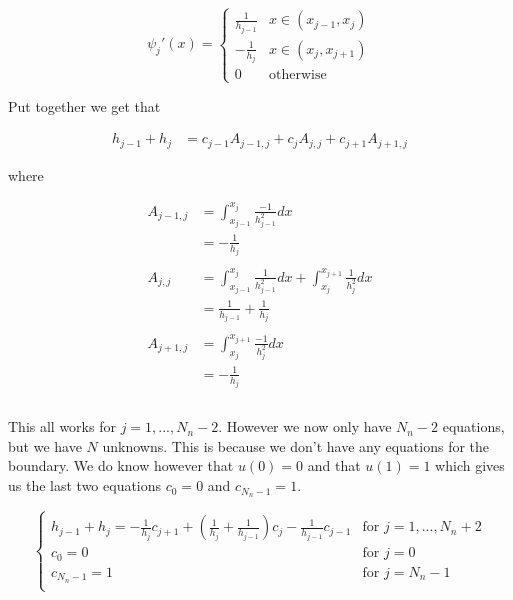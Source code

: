 \documentclass[12pt, a4paper]{article}
\begin{document}
{\begin{equation*}
    \psi_j'(x) = 
    \begin{cases}
        \frac{1}{h_{j-1}} & x \in (x_{j-1}, x_j) \\
        -\frac{1}{h_{j}} & x \in (x_{j}, x_{j+1})\\
        0 & \text{otherwise}
    \end{cases}
\end{equation*}

Put together we get that

\begin{align*}
    h_{j-1} + h_j &= c_{j-1}A_{j-1,j} + c_jA_{j,j} + c_{j+1}A_{j+1,j}
\end{align*}

where 

\begin{align*}
    A_{j-1,j} &= \int_{x_{j-1}}^{x_j} \frac{-1}{h_{j-1}^2} dx \\
    &= -\frac{1}{h_j} \\\\
    A_{j,j} &= \int_{x_{j-1}}^{x_j} \frac{1}{h_{j-1}^2} dx + \int_{x_{j}}^{x_{j+1}} \frac{1}{h_{j}^2} dx \\
    &= \frac{1}{h_{j-1}} + \frac{1}{h_j} \\\\
    A_{j+1,j} &= \int_{x_{j}}^{x_{j+1}} \frac{-1}{h_{j}^2} dx \\
    &= -\frac{1}{h_j} \\\\
\end{align*}

This all works for \(j = 1,..., N_n - 2\). However we now only have \(N_n - 2\) equations, but we have \(N\) unknowns. This is because we don't have any equations for the boundary. We do know however that \(u(0) = 0\) and that \(u(1) = 1\) which gives us the last two equations \(c_0 = 0\) and \(c_{N_n -1} = 1\). 

\begin{equation} \label{endelement}
    \begin{cases}
        h_{j-1} + h_j = -\frac{1}{h_j}c_{j+1} + \left(\frac{1}{h_j} + \frac{1}{h_{j-1}}\right)c_j - \frac{1}{h_{j-1}}c_{j-1}& \text{for \(j = 1,...,N_n + 2\)} \\
        c_0 = 0 & \text{for \(j = 0\)} \\
        c_{N_n - 1} = 1 & \text{for \(j = N_n - 1\)} \\
    \end{cases}
\end{equation}

}
\end{document}
